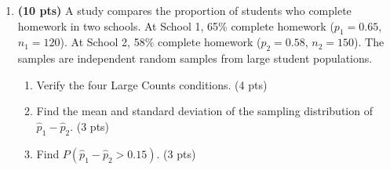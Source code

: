 \documentclass[10pt]{article}
\begin{document}
\begin{enumerate}[resume]
        \begin{enumerate}[label=(\alph*)]
          \item What is the probability that a single randomly selected bolt has length
                greater than 51.5 mm? \hfill (3 pts)
                \vspace{0.9in}
          \item A quality inspector measures a random sample of $n = 36$ bolts each shift.
                Check all three conditions for using the normal model for $\bar{x}$. \hfill (3 pts)
                \vspace{1.0in}
          \item Find $\mu_{\bar{x}}$ and $\sigma_{\bar{x}}$. \hfill (2 pts)
                \vspace{0.6in}
          \item Find $P(\bar{x} > 50.5)$. \hfill (4 pts)
                \vspace{1.0in}
          \item Compare your answers to (a) and (d). Explain why the probability for
                $\bar{x}$ is much smaller than the probability for a single bolt. \hfill (3 pts)
          \item The manufacturer is concerned if the sample mean falls below 49.4 mm.
                Find this probability and determine if this should be considered an unusual
                event. \hfill (3 pts)
                \vspace{1.0in}
        \end{enumerate}

  \item \textbf{(10 pts)} A study compares the proportion of students who complete
        homework in two schools. At School 1, 65\% complete homework ($p_1 = 0.65$,
        $n_1 = 120$). At School 2, 58\% complete homework ($p_2 = 0.58$, $n_2 = 150$).
        The samples are independent random samples from large student populations.

        \begin{enumerate}[label=(\alph*)]
          \item Verify the four Large Counts conditions. \hfill (4 pts)
                \vspace{0.8in}
          \item Find the mean and standard deviation of the sampling distribution of
                $\hat{p}_1 - \hat{p}_2$. \hfill (3 pts)
                \vspace{0.7in}
          \item Find $P(\hat{p}_1 - \hat{p}_2 > 0.15)$. \hfill (3 pts)
                \vspace{0.9in}
        \end{enumerate}

\end{enumerate}
\end{document}
